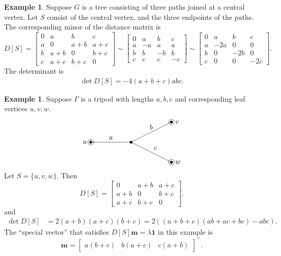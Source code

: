 \documentclass{amsart}
\theoremstyle{definition}
\newtheorem{eg}[thm]{Example}
\newcommand{\boldm}{\mathbf{m}}
\newcommand{\tr}{\intercal}
\begin{document}
\begin{eg}
Suppose $G$ is a tree consisting of three paths joined at a central vertex.
Let $S$ consist of the central vertex, and the three endpoints of the paths. 
The corresponding minor of the distance matrix is
\[
	D[S] = \begin{bmatrix}
	0 & a & b & c \\
	a & 0 & a + b & a + c \\
	b & a + b & 0 & b + c \\
	c & a + c & b + c & 0
	\end{bmatrix}
	\sim \begin{bmatrix}
	0 & a & b & c \\
	a & -a & a  & a \\
	b & b & -b & b \\
	c & c & c & -c
	\end{bmatrix}
	\sim \begin{bmatrix}
	0 & a & b & c \\
	a & -2a & 0 & 0 \\
	b & 0 & -2b & 0 \\
	c & 0 & 0 & -2c
	\end{bmatrix}.
\]
The determinant is
\begin{align*}
	\det D[S] = -4(a+b+c)abc.
\end{align*}
\end{eg}

\begin{eg}
Suppose $\Gamma$ is a tripod with lengths $a,b,c$ and corresponding leaf vertices $u,v,w$.
\[
\begin{tikzpicture}
	\coordinate (u) at (-2,0);
	\coordinate (v) at (2,1);
	\coordinate (w) at (2,-1);
	\coordinate (o) at (0,0);

	\draw (o) -- (u);
	\draw (v) -- (o) -- (w);

	\foreach \c in {u, v, w, o} {
		\fill (\c) circle (2pt);
	}
	\foreach \c in {u, v, w} {
		\draw (\c) circle (4pt);
	}
	
	\node[left=2pt] at (u) {$u$};
	\node[right=2pt] at (v) {$v$};
	\node[right=2pt] at (w) {$w$};

	\node[above] at (-1,0) {$a$};
	\node[above] at (1,0.5) {$b$};
	\node[above right] at (1,-0.5) {$c$};
\end{tikzpicture}
\]
Let $S = \{u,v,w\}$.
Then 
\[
	D[S] = \begin{bmatrix}
	0 & a + b & a + c \\
	a + b & 0 & b + c \\
	a + c & b + c & 0
	\end{bmatrix}.
\]
and
\begin{align*}
	\det D[S] &= 2(a+b)(a+c)(b+c) 
	= 2\left( (a+b+c)(ab + ac + bc) - abc \right).
\end{align*}
The ``special vector'' that satisfies $D[S] \boldm = \lambda \mathbf{1}$ in this example is 
$$
\boldm = \begin{bmatrix} a(b + c) & b(a + c) & c(a + b) \end{bmatrix}^\tr .
$$
\end{eg}
\end{document}

